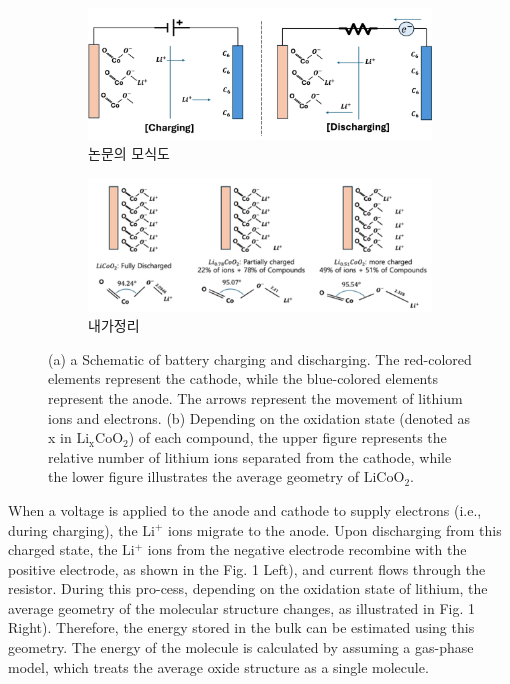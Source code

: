 \documentclass[pdflatex,sn-mathphys-num]{sn-jnl}%
\theoremstyle{thmstyleone}%
\theoremstyle{thmstyletwo}%
\theoremstyle{thmstylethree}%
\begin{document}
\begin{figure}[H]
  \centering
  \begin{subfigure}[b]{0.45\textwidth}
    \includegraphics[width=\textwidth]{fig/Cha_discha.png}
    \caption{논문의 모식도}
    \label{fig:first}
  \end{subfigure}
  \hfill
  \hfill
  \begin{subfigure}[b]{0.45\textwidth}
    \includegraphics[width=\textwidth]{fig/char.png}
    \caption{내가정리}
    \label{fig:second}
  \end{subfigure}
  \caption{(a) a Schematic of battery charging and discharging. The red-colored elements represent the cathode, while the blue-colored elements represent the anode. The arrows represent the movement of lithium ions and electrons. (b) Depending on the oxidation state (denoted as x in \(\mathrm{Li_xCoO_2}\)) of each compound, the upper figure represents the relative number of lithium ions separated from the cathode, while the lower figure illustrates the average geometry of \(\mathrm{LiCoO_2}\).}
  \label{fig:two_figures_side_by_side}
\end{figure}
When a voltage is applied to the anode and cathode to supply electrons (i.e., during charging), the  \(\mathrm{Li^+}\) ions migrate to the anode. 
Upon discharging from this charged state, the \(\mathrm{Li^+}\) ions from the negative electrode recombine with the positive electrode, as shown in the Fig. 1 Left), and current flows through the resistor. 
During this pro-cess, depending on the oxidation state of lithium, the average geometry of the molecular structure changes, as illustrated in Fig. 1 Right).
Therefore, the energy stored in the bulk can be estimated using this geometry. 
The energy of the molecule is calculated by assuming a gas-phase model, which treats the average oxide structure as a single molecule.
\end{document}
